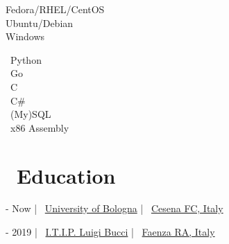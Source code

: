 \documentclass{article}
\begin{document}
\begin{paracol}{2}
\begin{tcolorbox}[title=\faServer \ Operating Systems]
    \textcolor[HTML]{EE0000}{\faRedhat} Fedora/RHEL/CentOS \\
    \textcolor[HTML]{E95420}{\faUbuntu} Ubuntu/Debian \\
    \textcolor[HTML]{0078D6}{\faWindows} Windows
\end{tcolorbox}

\begin{tcolorbox}[title=\faCode \ Programming]
    \faPython \ Python \\
    \faGoogle \ Go \\
    \faFileCode \ C \\
    \faMicrosoft \ C\# \\
    \faDatabase \ (My)SQL \\
    \faMicrochip \ x86 Assembly
\end{tcolorbox}

\vspace{45pt}
\begin{center}
    \hypersetup{urlcolor=black}
\end{center}
\vspace{45pt}

\switchcolumn

\maketitle

%
%

\vfill

\section*{\faGraduationCap \ Education}

\begin{tcolorbox}[title=\faBookOpen \ \href{https://corsi.unibo.it/1cycle/ComputerScienceEngineering}{Bachelor in Computer Science and Engineering}]
     - Now \hfill | \hfill
    \faUniversity \ \href{https://www.unibo.it/en/}{University of Bologna} \hfill | \hfill
    \faCity \ \href{https://www.openstreetmap.org/relation/42809}{Cesena FC, Italy}
\end{tcolorbox}

\begin{tcolorbox}[title=\faBook \ High School Diploma in Information Technology]
     - 2019 \hfill | \hfill
    \faSchool \ \href{https://www.itipfaenza.edu.it/}{I.T.I.P. Luigi Bucci} \hfill | \hfill
    \faCity \ \href{https://www.openstreetmap.org/relation/43004}{Faenza RA, Italy}
\end{tcolorbox}


\end{paracol}
\end{document}
